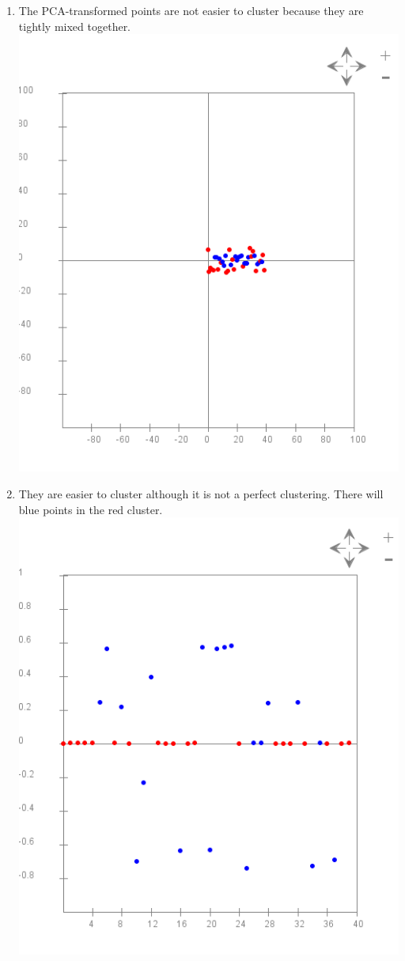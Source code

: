 \documentclass{article}
\begin{document}
\begin{enumerate}
\item The PCA-transformed points are not easier to cluster because they are tightly mixed together. \\
\includegraphics[scale=0.45]{exercise26}

\item They are easier to cluster although it is not a perfect clustering. There will blue points in the red cluster. \\
\includegraphics[scale=0.5]{exercise27}


\end{enumerate}
\end{document}
